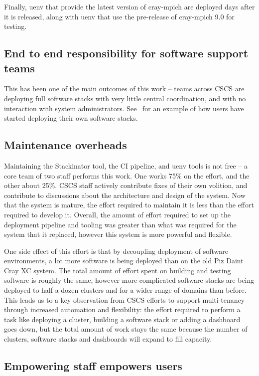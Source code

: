 Finally, uenv that provide the latest version of cray-mpich are deployed days after it is released, along with uenv that use the pre-release of cray-mpich 9.0 for testing.

\subsection{End to end responsibility for software support teams}

This has been one of the main outcomes of this work -- teams across CSCS are deploying full software stacks with very little central coordination, and with no interaction with system administrators.
See~ for an example of how users have started deploying their own software stacks.

\subsection{Maintenance overheads}
\label{sec:discuss-staff}

Maintaining the Stackinator tool, the CI pipeline,  and uenv tools is not free -- a core team of two staff performs this work.
One works 75\% on the effort, and the other about 25\%.
CSCS staff actively contribute fixes of their own volition, and contribute to discussions about the architecture and design of the system.
Now that the system is mature, the effort required to maintain it is less than the effort required to develop it.
Overall, the amount of effort required to set up the deployment pipeline and tooling was greater than what was required for the system that it replaced, however this system is more powerful and flexible.

One side effect of this effort is that by decoupling deployment of software environments, a lot more software is being deployed than on the old Piz Daint Cray XC system.
The total amount of effort spent on building and testing software is roughly the same, however more complicated software stacks are being deployed to half a dozen clusters and for a wider range of domains than before.
This leads us to a key observation from CSCS efforts to support multi-tenancy through increased automation and flexibility: the effort required to perform a task like deploying a cluster, building a software stack or adding a dashboard goes down, but the total amount of work stays the same because the number of clusters, software stacks and dashboards will expand to fill capacity.

\subsection{Empowering staff empowers users}
\label{sec:discuss-wc}

